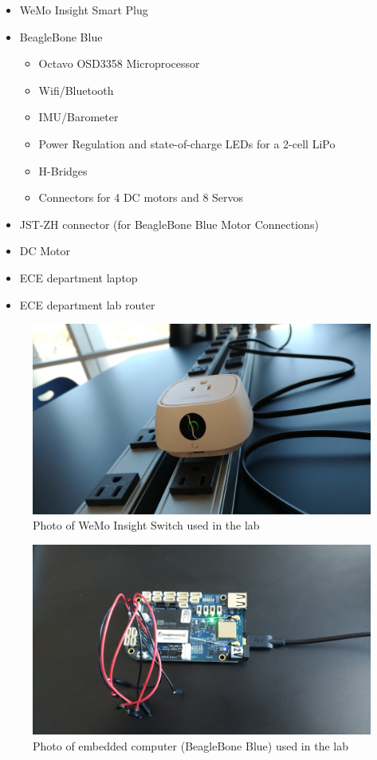 \documentclass[letterpaper,12pt]{article}   %
\begin{document}
\begin{itemize}
    \item WeMo Insight Smart Plug
    \item BeagleBone Blue
    \begin{itemize}
        \item Octavo OSD3358 Microprocessor
        \item Wifi/Bluetooth
        \item IMU/Barometer
        \item Power Regulation and state-of-charge LEDs for a 2-cell LiPo
        \item H-Bridges
        \item Connectors for 4 DC motors and 8 Servos
    \end{itemize}
    \item JST-ZH connector (for BeagleBone Blue Motor Connections)
    \item DC Motor
    \item ECE department laptop
    \item ECE department lab router
\end{itemize}

\begin{figure}[H]
    \centering
    \includegraphics[scale=0.09]{figs/wemo/wemo.jpg}
    \caption{Photo of WeMo Insight Switch used in the lab}
    \label{fig:expLabSetup}
\end{figure}

\begin{figure}[H]
    \centering
    \includegraphics[scale=0.09]{figs/beaglebone/beagleBone.jpg}
    \caption{Photo of embedded computer (BeagleBone Blue) used in the lab}
    \label{fig:expLabSetup}
\end{figure}
\end{document}

